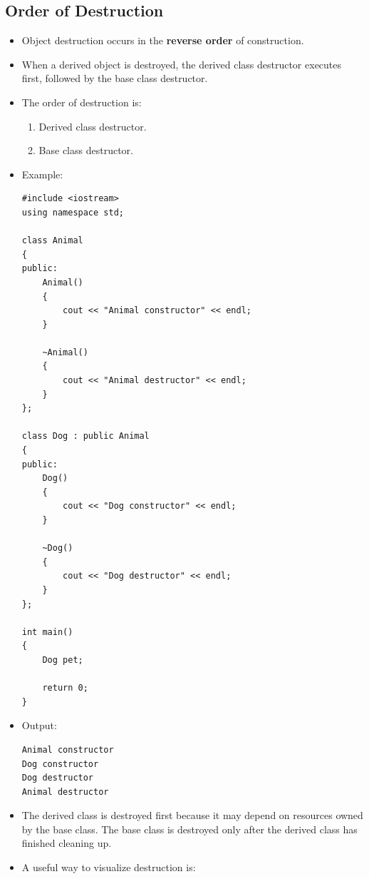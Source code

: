 \documentclass[10pt]{article}
\begin{document}
\newpage

\subsection{Order of Destruction}
\begin{itemize}
    \item Object destruction occurs in the \textbf{reverse order} of construction.

    \item When a derived object is destroyed, the derived class destructor
    executes first, followed by the base class destructor.

    \item The order of destruction is:
    \begin{enumerate}
        \item Derived class destructor.
        \item Base class destructor.
    \end{enumerate}

    \item Example:

\begin{verbatim}
#include <iostream>
using namespace std;

class Animal
{
public:
    Animal()
    {
        cout << "Animal constructor" << endl;
    }

    ~Animal()
    {
        cout << "Animal destructor" << endl;
    }
};

class Dog : public Animal
{
public:
    Dog()
    {
        cout << "Dog constructor" << endl;
    }

    ~Dog()
    {
        cout << "Dog destructor" << endl;
    }
};

int main()
{
    Dog pet;

    return 0;
}
\end{verbatim}

    \item Output:

\begin{verbatim}
Animal constructor
Dog constructor
Dog destructor
Animal destructor
\end{verbatim}

    \item The derived class is destroyed first because it may depend on
    resources owned by the base class. The base class is destroyed only
    after the derived class has finished cleaning up.

    \item A useful way to visualize destruction is:


\end{itemize}
\end{document}
